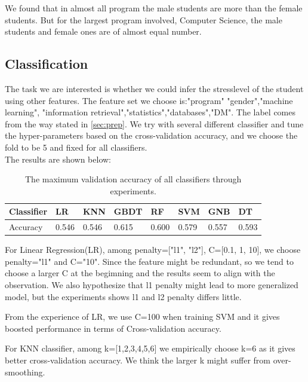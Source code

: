 \documentclass[runningheads]{llncs}
\begin{document}
We found that in almost all program the male students are more than the female students. But for the largest program involved, Computer Science, the male students and female ones are of almost equal number.


\subsection{Classification}
\label{sec:clf}
The task we are interested is whether we could infer the stresslevel of the student using other features. The feature set we choose is:"program" "gender","machine learning", "information retrieval","statistics","databases","DM". The label comes from the way stated in \ref{sec:prep}. We try with several different classifier and tune the hyper-parameters based on the cross-validation accuracy, and we choose the fold to be 5 and fixed for all classifiers.\\ The results are shown below:
\begin{table}[]
    \centering
    \caption{The maximum validation accuracy of all classifiers through experiments.}
    \begin{tabular}{|l|l|l|l|l|l|l|l|}
        \hline
        Classifier & LR    & KNN   & GBDT  & RF    & SVM   & GNB   & DT    \\ \hline
        Accuracy & 0.546 & 0.546 & 0.615 & 0.600 & 0.579 & 0.557 & 0.593 \\ \hline
    \end{tabular}
    \label{fig:gender}
\end{table}
For Linear Regression(LR), among penalty=["l1", "l2"], C=[0.1, 1, 10], we choose penalty="l1" and C="10". Since the feature might be redundant, so we tend to choose a larger C at the begimning and the results seem to align with the observation. We also hypothesize that l1 penalty might lead to more generalized model, but the experiments shows l1 and l2 penalty differs little.

From the experience of LR, we use C=100 when training SVM and it gives boosted performance in terms of Cross-validation accuracy.

For KNN classifier, among k=[1,2,3,4,5,6] we empirically choose k=6 as it gives better cross-validation accuracy. We think the larger k might suffer from over-smoothing.
\end{document}

